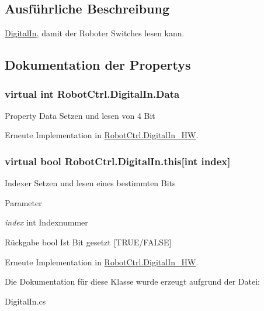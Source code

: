 \subsection{Ausführliche Beschreibung}
\hyperlink{class_robot_ctrl_1_1_digital_in}{DigitalIn}, damit der Roboter Switches lesen kann. 

\subsection{Dokumentation der Propertys}
\hypertarget{class_robot_ctrl_1_1_digital_in_a9f730b21d4845684a1e085293d2cba50}{
\subsubsection[{Data}]{\setlength{\rightskip}{0pt plus 5cm}virtual int RobotCtrl.DigitalIn.Data}}
\label{class_robot_ctrl_1_1_digital_in_a9f730b21d4845684a1e085293d2cba50}
Property Data Setzen und lesen von 4 Bit 

Erneute Implementation in \hyperlink{class_robot_ctrl_1_1_digital_in___h_w_a22093ed6e3a1b15bbb0406fd56d9b0cc}{RobotCtrl.DigitalIn\_\-HW}.

\hypertarget{class_robot_ctrl_1_1_digital_in_adabed7783bc3ad5603e1adbf2bc37484}{
\subsubsection[{this}]{\setlength{\rightskip}{0pt plus 5cm}virtual bool RobotCtrl.DigitalIn.this\mbox{[}int index\mbox{]}}}
\label{class_robot_ctrl_1_1_digital_in_adabed7783bc3ad5603e1adbf2bc37484}
Indexer Setzen und lesen eines bestimmten Bits


\begin{DoxyParams}{Parameter}
\item[{\em index}]int Indexnummer \end{DoxyParams}
\begin{DoxyReturn}{Rückgabe}
bool Ist Bit gesetzt \mbox{[}TRUE/FALSE\mbox{]} 
\end{DoxyReturn}


Erneute Implementation in \hyperlink{class_robot_ctrl_1_1_digital_in___h_w_a1197c7dee03f1a9844a5824e3c6e0941}{RobotCtrl.DigitalIn\_\-HW}.



Die Dokumentation für diese Klasse wurde erzeugt aufgrund der Datei:\begin{DoxyCompactItemize}
\item 
DigitalIn.cs\end{DoxyCompactItemize}

